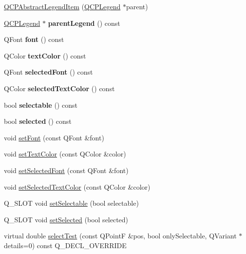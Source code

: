 \begin{DoxyCompactItemize}
\item 
\hyperlink{classQCPAbstractLegendItem_afaff87610e8da0fa238ecf552872d774}{Q\+C\+P\+Abstract\+Legend\+Item} (\hyperlink{classQCPLegend}{Q\+C\+P\+Legend} $\ast$parent)
\item 
\mbox{\label{classQCPAbstractLegendItem_a15709a3f6b2ce3946261fe90422ae32e}} 
\hyperlink{classQCPLegend}{Q\+C\+P\+Legend} $\ast$ {\bfseries parent\+Legend} () const
\item 
\mbox{\label{classQCPAbstractLegendItem_a699b18e1d9e70372e51e75f462dbb643}} 
Q\+Font {\bfseries font} () const
\item 
\mbox{\label{classQCPAbstractLegendItem_a35b35fa697dcece86cf7e5818c0820b2}} 
Q\+Color {\bfseries text\+Color} () const
\item 
\mbox{\label{classQCPAbstractLegendItem_ace98814b31762578228f6b32111cd3c0}} 
Q\+Font {\bfseries selected\+Font} () const
\item 
\mbox{\label{classQCPAbstractLegendItem_a09540594509fb0074f3a1b39548e3bdc}} 
Q\+Color {\bfseries selected\+Text\+Color} () const
\item 
\mbox{\label{classQCPAbstractLegendItem_af054a668038bcd7e35a35a07d1e79a23}} 
bool {\bfseries selectable} () const
\item 
\mbox{\label{classQCPAbstractLegendItem_adf427dbb05d5f1a8e84c6abcb05becdf}} 
bool {\bfseries selected} () const
\item 
void \hyperlink{classQCPAbstractLegendItem_a409c53455d8112f71d70c0c43eb10265}{set\+Font} (const Q\+Font \&font)
\item 
void \hyperlink{classQCPAbstractLegendItem_a6ebace6aaffaedcdab2d74e88acc2d1e}{set\+Text\+Color} (const Q\+Color \&color)
\item 
void \hyperlink{classQCPAbstractLegendItem_a91db5aee48617a9d3206e61376807365}{set\+Selected\+Font} (const Q\+Font \&font)
\item 
void \hyperlink{classQCPAbstractLegendItem_a4d01d008ee1a5bfe9905b0397a421936}{set\+Selected\+Text\+Color} (const Q\+Color \&color)
\item 
Q\+\_\+\+S\+L\+OT void \hyperlink{classQCPAbstractLegendItem_a9913ef48730551b696e7f98a2391c599}{set\+Selectable} (bool selectable)
\item 
Q\+\_\+\+S\+L\+OT void \hyperlink{classQCPAbstractLegendItem_a6eed93b0ab99cb3eabb043fb08179c2b}{set\+Selected} (bool selected)
\item 
virtual double \hyperlink{classQCPAbstractLegendItem_a80ec112a6608fc39dbed56239849b187}{select\+Test} (const Q\+PointF \&pos, bool only\+Selectable, Q\+Variant $\ast$details=0) const Q\+\_\+\+D\+E\+C\+L\+\_\+\+O\+V\+E\+R\+R\+I\+DE
\end{DoxyCompactItemize}

